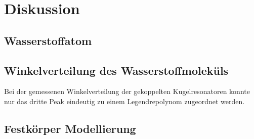 \section{Diskussion}
\label{sec:diskussion}

\subsection{Wasserstoffatom}
\subsection{Winkelverteilung des Wasserstoffmoleküls}

Bei der gemessenen Winkelverteilung der gekoppelten Kugelresonatoren konnte nur das dritte Peak eindeutig zu einem Legendrepolynom zugeordnet werden. 

\subsection{Festkörper Modellierung}